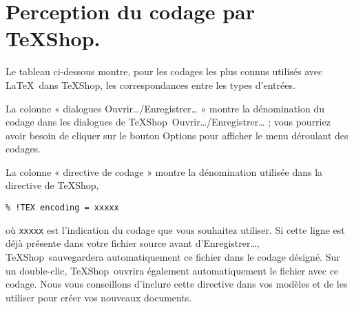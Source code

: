 \documentclass[11pt,french]{article}
\newcommand{\TS}{\textsf{\TeX Shop}}
\newcommand{\cmd}[1]{\textsf{#1}}
\begin{document}

\section{Perception du codage par \TS.}\label{thetable}

Le tableau ci-dessous montre, pour les codages les plus connus utilisés avec \LaTeX\ dans \TS, les correspondances entre les types d'entrées.

La colonne « dialogues Ouvrir…/Enregistrer… » montre la dénomination du codage dans les dialogues de \TS\ Ouvrir…/Enregistrer… ; vous pourriez avoir besoin de cliquer sur le bouton \cmd{Options} pour afficher le menu déroulant des codages. 

La colonne « directive de codage » montre la dénomination utilisée dans la directive de \TS,
\begin{verbatim}
% !TEX encoding = xxxxx
\end{verbatim}
où \texttt{xxxxx} est l'indication du codage que vous souhaitez utiliser. Si cette ligne est déjà présente dans votre fichier source avant d'\cmd{Enregistrer…}, \TS\ sauvegardera automatiquement ce fichier dans le codage désigné. Sur un \cmd{double-clic}, \TS\ ouvrira également automatiquement le fichier avec ce codage. Nous vous conseillons d'inclure cette directive dans vos modèles et de les utiliser pour créer vos nouveaux documents.
\end{document}
